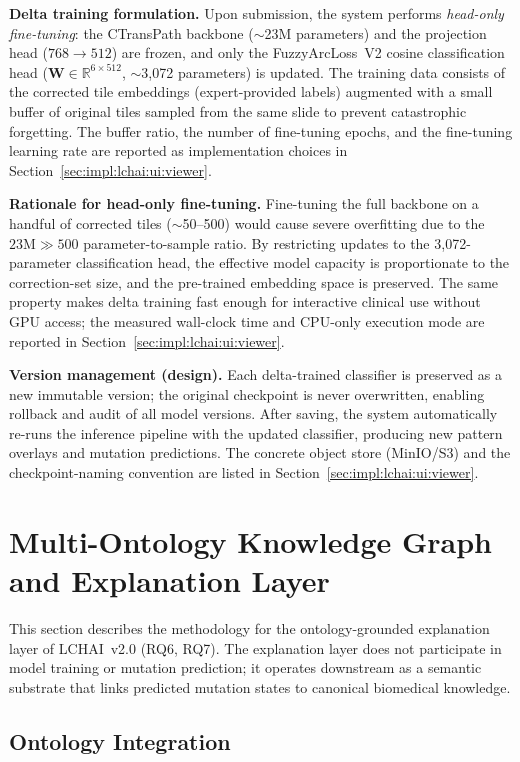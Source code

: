 \textbf{Delta training formulation.}
Upon submission, the system performs \emph{head-only fine-tuning}:
the CTransPath backbone ($\sim$23M parameters) and the projection
head ($768 \to 512$) are frozen, and only the FuzzyArcLoss~V2 cosine
classification head ($\mathbf{W} \in \mathbb{R}^{6 \times 512}$,
$\sim$3{,}072 parameters) is updated.
The training data consists of the corrected tile embeddings
(expert-provided labels) augmented with a small buffer of original
tiles sampled from the same slide to prevent catastrophic forgetting.
The buffer ratio, the number of fine-tuning epochs, and the
fine-tuning learning rate are reported as implementation choices in
Section~\ref{sec:impl:lchai:ui:viewer}.

\textbf{Rationale for head-only fine-tuning.}
Fine-tuning the full backbone on a handful of corrected tiles
($\sim$50--500) would cause severe overfitting due to the
$23\text{M} \gg 500$ parameter-to-sample ratio.
By restricting updates to the 3{,}072-parameter classification head,
the effective model capacity is proportionate to the correction-set
size, and the pre-trained embedding space is preserved.
The same property makes delta training fast enough for interactive
clinical use without GPU access; the measured wall-clock time and
CPU-only execution mode are reported in
Section~\ref{sec:impl:lchai:ui:viewer}.

\textbf{Version management (design).}
Each delta-trained classifier is preserved as a new immutable version;
the original checkpoint is never overwritten, enabling rollback and
audit of all model versions.
After saving, the system automatically re-runs the inference pipeline
with the updated classifier, producing new pattern overlays and
mutation predictions.
The concrete object store (MinIO/S3) and the checkpoint-naming
convention are listed in Section~\ref{sec:impl:lchai:ui:viewer}.


\section{Multi-Ontology Knowledge Graph and Explanation Layer}
\label{sec:meth:ontology_method}
 
This section describes the methodology for the ontology-grounded
explanation layer of LCHAI~v2.0 (RQ6, RQ7).
The explanation layer does not participate in model training or mutation
prediction; it operates downstream as a semantic substrate that links
predicted mutation states to canonical biomedical knowledge.
 
\subsection{Ontology Integration}
\label{sec:meth:ontology:integration}
 
